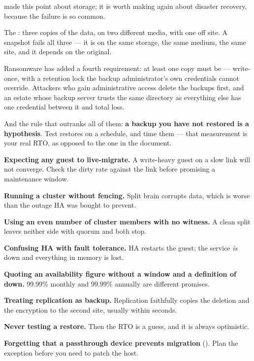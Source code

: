 \begin{conceptbox}
 made this point about storage; it is worth making again about
disaster recovery, because the failure is so common.

\smallskip
The : three copies of the data, on two different media, with
one off site. A snapshot fails all three --- it is on the same storage, the
same medium, the same site, and it depends on the original.

\smallskip
Ransomware has added a fourth requirement: at least one copy must be
 --- write-once, with a retention lock the backup
administrator's own credentials cannot override. Attackers who gain
administrative access delete the backups first, and an estate whose backup
server trusts the same directory as everything else has one credential between
it and total loss.

\smallskip
And the rule that outranks all of them: \textbf{a backup you have not restored
is a hypothesis}. Test restores on a schedule, and time them --- that
measurement is your real RTO, as opposed to the one in the document.
\end{conceptbox}

\begin{pitfall}
\begin{tight}
  \item \textbf{Expecting any guest to live-migrate.} A write-heavy guest on a
        slow link will not converge. Check the dirty rate against the link
        before promising a maintenance window.
  \item \textbf{Running a cluster without fencing.} Split brain corrupts data,
        which is worse than the outage HA was bought to prevent.
  \item \textbf{Using an even number of cluster members with no witness.} A
        clean split leaves neither side with quorum and both stop.
  \item \textbf{Confusing HA with fault tolerance.} HA restarts the guest; the
        service \emph{is} down and everything in memory is lost.
  \item \textbf{Quoting an availability figure without a window and a
        definition of down.} 99.99\% monthly and 99.99\% annually are different
        promises.
  \item \textbf{Treating replication as backup.} Replication faithfully copies
        the deletion and the encryption to the second site, usually within
        seconds.
  \item \textbf{Never testing a restore.} Then the RTO is a guess, and it is
        always optimistic.
  \item \textbf{Forgetting that a passthrough device prevents migration}
        (). Plan the exception before you need to patch the
        host.
\end{tight}
\end{pitfall}

